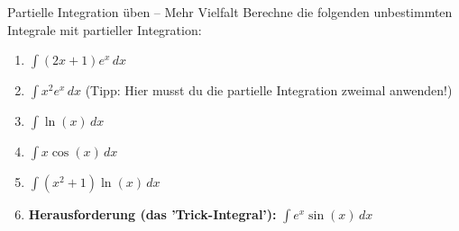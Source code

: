 \begin{aufgabenumgebung}{Partielle Integration üben – Mehr Vielfalt}
Berechne die folgenden unbestimmten Integrale mit partieller Integration:
\begin{enumerate}
    \item $\int (2x+1)e^x \,dx$
    \item $\int x^2 e^x \,dx$ (Tipp: Hier musst du die partielle Integration zweimal anwenden!)
    \item $\int \ln(x) \,dx$
    \item $\int x \cos(x) \,dx$
    \item $\int (x^2+1)\ln(x) \,dx$
    \item \textbf{Herausforderung (das 'Trick-Integral'):} $\int e^x \sin(x) \,dx$

\end{enumerate}
\end{aufgabenumgebung}

